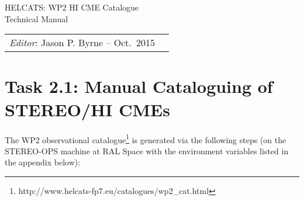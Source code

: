 \documentclass[12pt, a4paper, oneside]{article}
\begin{document}








\begin{center}
{\sc \Large HELCATS: WP2 HI CME Catalogue\\ Technical Manual}
\end{center}

 
\begin{center}
\begin{tabular}{ll}
\textit{Editor}: Jason P. Byrne -- Oct.~2015
\end{tabular}
\end{center}
 

\section*{\sc Task 2.1: Manual Cataloguing of STEREO/HI CMEs}

The WP2 observational catalogue\footnote{http://www.helcats-fp7.eu/catalogues/wp2\_cat.html} is generated via the following steps (on the STEREO-OPS machine at RAL Space with the environment variables listed in the appendix below):
\end{document}
